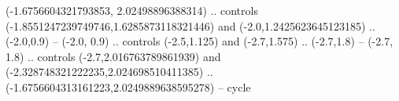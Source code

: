 (-1.6756604321793853, 2.02498896388314) .. controls (-1.8551247239749746,1.6285873118321446) and (-2.0,1.2425623645123185) .. (-2.0,0.9) --
(-2.0, 0.9) .. controls (-2.5,1.125) and (-2.7,1.575) .. (-2.7,1.8) --
(-2.7, 1.8) .. controls (-2.7,2.016763789861939) and (-2.328748321222235,2.024698510411385) .. (-1.6756604313161223,2.0249889638595278) --
cycle